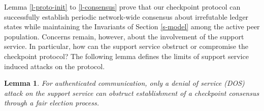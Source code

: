 \documentclass[conference]{IEEEtran}
\newtheorem{lemma}[theorem]{Lemma}
\begin{document}
Lemma \ref{l-proto-init} to \ref{l-consensus} prove that our checkpoint protocol can successfully establish periodic network-wide consensus about irrefutable ledger states while maintaining the Invariants of Section \ref{s-model} among the active peer population. Concerns remain, however, about the involvement of the support service. In particular, how can the support service obstruct or compromise the checkpoint protocol? The following lemma defines the limits of support service induced attacks on the protocol.

\begin{lemma}
\label{l-support-attack}
For authenticated communication, only a denial of service (DOS) attack  on the support service can obstruct establishment of a checkpoint consensus through a fair election process.    
\end{lemma}
\end{document}
